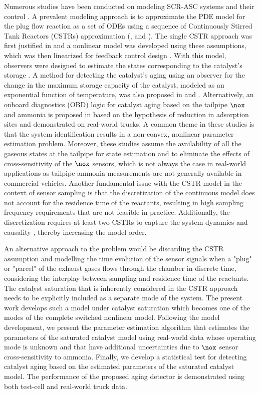 Numerous studies have been conducted on modeling SCR-ASC systems and their control \citep{yuan2015diesel}. A
prevalent modeling approach is to approximate the PDE model for the plug flow reaction as a set of ODEs using a sequence
of Continuously Stirred Tank Reactors (CSTRs) approximation (\citealt{hsieh2011development}, and \citealt{nova2014urea}). The
single CSTR approach was first justified in \citet{devarakonda2008adequacy} and a nonlinear model was developed using
these assumptions, which was then linearized for feedback control design \citep{devarakonda2009model}. With this model,
observers were designed to estimate the states corresponding to the catalyst's storage \citep{ma2017observer,jain2020term}. A method for detecting the catalyst's aging using an observer for the change in the maximum
storage capacity of the catalyst, modeled as an exponential function of temperature, was also proposed in
\citet{ma2017observer} and \citet{jiang2019hydrothermal}. Alternatively, an onboard diagnostics (OBD) logic for catalyst
aging based on the tailpipe $\nox$ and ammonia is proposed in \citet{matsumoto2016model} based on the hypothesis of
reduction in adsorption sites and demonstrated on real-world trucks. A common theme in these studies is that the system
identification results in a non-convex, nonlinear parameter estimation problem. Moreover, these studies assume the
availability of all the gaseous states at the tailpipe for state estimation and to eliminate the effects of
cross-sensitivity of the $\nox$ sensors, which is not always the case in real-world applications as tailpipe ammonia
measurements are not generally available in commercial vehicles. Another fundamental issue with the CSTR model in the
context of sensor sampling is that the discretization of the continuous model does not account for the residence time
of the reactants, resulting in high sampling frequency requirements that are not feasible in practice. Additionally, the
discretization requires at least two CSTRs to capture the system dynamics and causality \citep{charla2024reduced},
thereby increasing the model order.

An alternative approach to the problem would be discarding the CSTR assumption and modelling the time evolution of the
sensor signals when a "plug" or "parcel" of the exhaust gases flows through the chamber in discrete time, considering the
interplay between sampling and residence time of the reactants. The catalyst saturation that is inherently considered in
the CSTR approach needs to be explicitly included as a separate mode of the system. The present work develops such a
model under catalyst saturation which becomes one of the modes of the complete switched nonlinear model. Following the
model development, we present the parameter estimation algorithm that estimates the parameters of the saturated catalyst
model using real-world data whose operating mode is unknown and that have additional uncertainties due to $\nox$ sensor
cross-sensitivity to ammonia. Finally, we develop a statistical test for detecting catalyst aging based on the
estimated parameters of the saturated catalyst model. The performance of the proposed aging detector is demonstrated
using both test-cell and real-world truck data.
